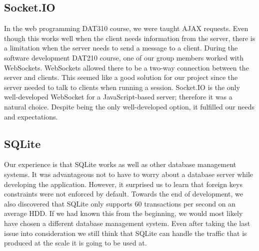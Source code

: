\subsection{Socket.IO}
In the web programming DAT310 course, we were taught AJAX requests. Even though this works well when the client needs information from the server, there is a limitation when the server needs to send a message to a client. During the software development DAT210 course, one of our group members worked with WebSockets. WebSockets allowed there to be a two-way connection between the server and clients. This seemed like a good solution for our project since the server needed to talk to clients when running a session. Socket.IO is the only well-developed WebSocket for a JavaScript-based server; therefore it was a natural choice. Despite being the only well-developed option, it fulfilled our needs and expectations.

\subsection{SQLite}
Our experience is that SQLite works as well as other database management systems. It was advantageous not to have to worry about a database server while developing the application. However, it surprised us to learn that foreign keys constraints were not enforced by default. Towards the end of development, we also discovered that SQLite only supports 60 transactions per second on an average HDD. If we had known this from the beginning, we would most likely have chosen a different database management system. Even after taking the last issue into consideration we still think that SQLite can handle the traffic that is produced at the scale it is going to be used at. 
